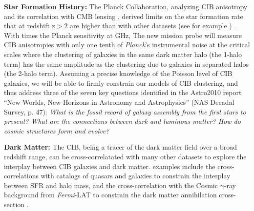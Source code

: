 {\bf Star Formation History:}
The Planck Collaboration, analyzing CIB anisotropy and its correlation with CMB lensing \citep{planck2014-XXX,planckXVIII},
derived limits on the star formation rate that
at redshift $\mathrm{z>2}$ are higher than with other datasets (see for example \cite{madau2014}) 
. With  times  the Planck sensitivity at  GHz, 
The new mission probe will measure CIB anisotropies
with only one tenth of {\it Planck}'s instrumental noise at the critical
scales where the clustering of galaxies in the same dark matter
halo (the 1-halo term) has the same amplitude as the
clustering due to galaxies in separated halos
(the 2-halo term). Assuming a precise knowledge of the Poisson level of CIB
galaxies, we will be able to firmly constrain our models of CIB clustering,
and thus address three of the seven key questions
identified in the Astro2010 report ``New Worlds, New Horizons in Astronomy and Astrophysics''
(NAS Decadal Survey, p. 47): {\it What is the fossil record of galaxy assembly                                                   
from the first stars to present? What are the connections                                           
between dark and luminous matter? How do cosmic structures form and evolve?}

{\bf Dark Matter:}
The CIB, being a tracer of the dark matter field over a broad redshift range,
can be cross-correlatated with many other datasets to explore
the interplay between CIB galaxies and dark matter. examples include the cross-correlations
with catalogs of quasars \citep{wang2015} and
galaxies \citep{serra2014} to constrain the interplay between
SFR and halo mass, and the cross-correlation with the Cosmic
$\mathrm{\gamma}$-ray background from {\it Fermi}-LAT
\citep{fermi2016} to constrain the dark matter annihilation
cross-section \citep{cooray2016}.

